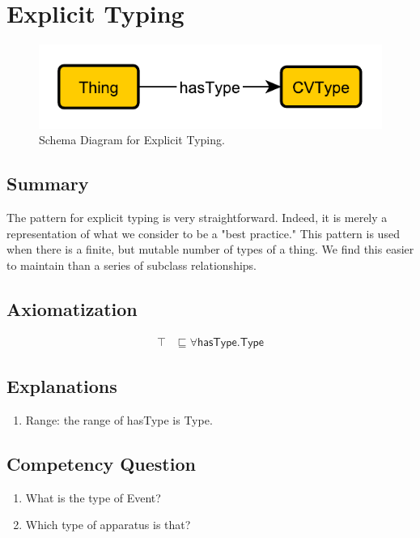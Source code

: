 \section{Explicit Typing}
\label{sec:Explicit}
\begin{figure}[h!]
\begin{center}
\includegraphics[width=.7\textwidth]{figures/explicit}
\end{center}
\caption{Schema Diagram for Explicit Typing.}
\label{fig:Explicit}
\end{figure}
\subsection{Summary}
\label{sum:Explicit}
The pattern for explicit typing is very straightforward. Indeed, it is merely a representation of what we consider to be a "best practice." This pattern is used when there is a finite, but mutable number of types of a thing. We find this easier to maintain than a series of subclass relationships.

\subsection{Axiomatization}
\label{axs:Explicit}
\begin{align}
\top &\sqsubseteq \forall\textsf{hasType.Type}  
\end{align}

\subsection{Explanations}
\label{exp:Explicit}
\begin{enumerate}
\item Range: the range of \textsf{hasType} is \textsf{Type}.
\end{enumerate}

\subsection{Competency Question}
\label{cqs:Explicit}
\begin{enumerate}[CQ1.]
\item What is the type of Event?
\item Which type of apparatus is that?
\end{enumerate}

\newpage
